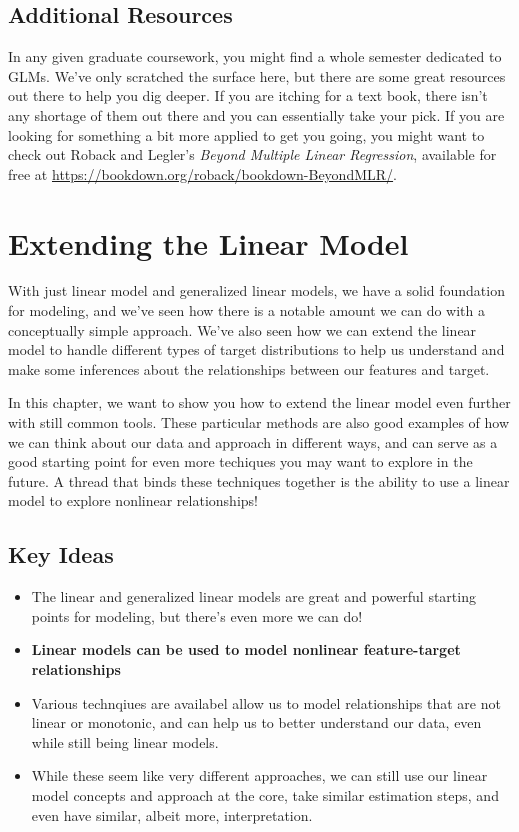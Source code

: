 \documentclass[
  letterpaper,
]{krantz}
\providecommand{\tightlist}{%
  \setlength{\itemsep}{0pt}\setlength{\parskip}{0pt}}\usepackage{longtable,booktabs,array}
\begin{document}
\section{Additional Resources}\label{sec-glm-resources}

In any given graduate coursework, you might find a whole semester
dedicated to GLMs. We've only scratched the surface here, but there are
some great resources out there to help you dig deeper. If you are
itching for a text book, there isn't any shortage of them out there and
you can essentially take your pick. If you are looking for something a
bit more applied to get you going, you might want to check out Roback
and Legler's \emph{Beyond Multiple Linear Regression}, available for
free at \url{https://bookdown.org/roback/bookdown-BeyondMLR/}.

\chapter{Extending the Linear Model}\label{sec-lm-extend}

With just linear model and generalized linear models, we have a solid
foundation for modeling, and we've seen how there is a notable amount we
can do with a conceptually simple approach. We've also seen how we can
extend the linear model to handle different types of target
distributions to help us understand and make some inferences about the
relationships between our features and target.

In this chapter, we want to show you how to extend the linear model even
further with still common tools. These particular methods are also good
examples of how we can think about our data and approach in different
ways, and can serve as a good starting point for even more techiques you
may want to explore in the future. A thread that binds these techniques
together is the ability to use a linear model to explore nonlinear
relationships!

\section{Key Ideas}\label{sec-lm-extend-key-ideas}

\begin{itemize}
\tightlist
\item
  The linear and generalized linear models are great and powerful
  starting points for modeling, but there's even more we can do!
\item
  \textbf{Linear models can be used to model nonlinear feature-target
  relationships}
\item
  Various technqiues are availabel allow us to model relationships that
  are not linear or monotonic, and can help us to better understand our
  data, even while still being linear models.
\item
  While these seem like very different approaches, we can still use our
  linear model concepts and approach at the core, take similar
  estimation steps, and even have similar, albeit more, interpretation.
\end{itemize}
\end{document}
